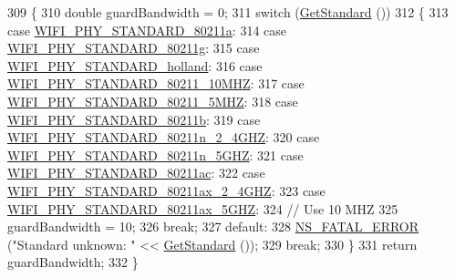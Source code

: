 \begin{DoxyCode}
309 \{
310   \textcolor{keywordtype}{double} guardBandwidth = 0;
311   \textcolor{keywordflow}{switch} (\hyperlink{classns3_1_1WifiPhy_af33f60586f8e0bd1763b863e7ce193b2}{GetStandard} ())
312     \{
313     \textcolor{keywordflow}{case} \hyperlink{group__wifi_gga1299834f4e1c615af3ca738033b76a49a22db1e8022db2c3450414b86c77b11e4}{WIFI\_PHY\_STANDARD\_80211a}:
314     \textcolor{keywordflow}{case} \hyperlink{group__wifi_gga1299834f4e1c615af3ca738033b76a49aeda6d90f260393ce003ec4765d8100af}{WIFI\_PHY\_STANDARD\_80211g}:
315     \textcolor{keywordflow}{case} \hyperlink{group__wifi_gga1299834f4e1c615af3ca738033b76a49aca926d77ddca0fc6d8cdcb190b2e520e}{WIFI\_PHY\_STANDARD\_holland}:
316     \textcolor{keywordflow}{case} \hyperlink{group__wifi_gga1299834f4e1c615af3ca738033b76a49aff863c98db467eb76170dc8bbe743de7}{WIFI\_PHY\_STANDARD\_80211\_10MHZ}:
317     \textcolor{keywordflow}{case} \hyperlink{group__wifi_gga1299834f4e1c615af3ca738033b76a49a8311083bdd8ae58e73ab6e81a53fd7be}{WIFI\_PHY\_STANDARD\_80211\_5MHZ}:
318     \textcolor{keywordflow}{case} \hyperlink{group__wifi_gga1299834f4e1c615af3ca738033b76a49a77e1cc9f77a0bce8e2bc82cbef437b5a}{WIFI\_PHY\_STANDARD\_80211b}:
319     \textcolor{keywordflow}{case} \hyperlink{group__wifi_gga1299834f4e1c615af3ca738033b76a49a6e449a5ca14fc7c0eb36064ce04a5192}{WIFI\_PHY\_STANDARD\_80211n\_2\_4GHZ}:
320     \textcolor{keywordflow}{case} \hyperlink{group__wifi_gga1299834f4e1c615af3ca738033b76a49aaabe94a0be4668583c42595437b4a6c0}{WIFI\_PHY\_STANDARD\_80211n\_5GHZ}:
321     \textcolor{keywordflow}{case} \hyperlink{group__wifi_gga1299834f4e1c615af3ca738033b76a49a7c078959de635b84fb280a955dcfb27e}{WIFI\_PHY\_STANDARD\_80211ac}:
322     \textcolor{keywordflow}{case} \hyperlink{group__wifi_gga1299834f4e1c615af3ca738033b76a49a21cd71f16aa85df0b571d52f9217f330}{WIFI\_PHY\_STANDARD\_80211ax\_2\_4GHZ}:
323     \textcolor{keywordflow}{case} \hyperlink{group__wifi_gga1299834f4e1c615af3ca738033b76a49af5b1e598f5b0d88c961c90ad1742355f}{WIFI\_PHY\_STANDARD\_80211ax\_5GHZ}:
324       \textcolor{comment}{// Use 10 MHZ}
325       guardBandwidth = 10;
326       \textcolor{keywordflow}{break};
327     \textcolor{keywordflow}{default}:
328       \hyperlink{group__fatal_ga5131d5e3f75d7d4cbfd706ac456fdc85}{NS\_FATAL\_ERROR} (\textcolor{stringliteral}{"Standard unknown: "} << \hyperlink{classns3_1_1WifiPhy_af33f60586f8e0bd1763b863e7ce193b2}{GetStandard} ());
329       \textcolor{keywordflow}{break};
330     \}
331   \textcolor{keywordflow}{return} guardBandwidth;
332 \}
\end{DoxyCode}


